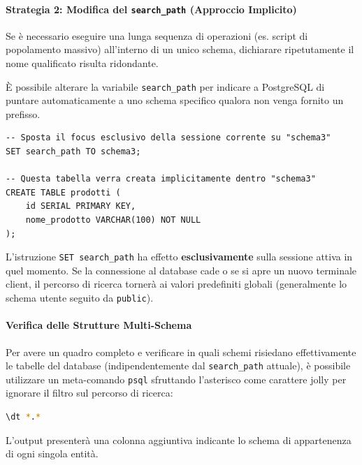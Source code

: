 \paragraph{Strategia 2: Modifica del \texttt{search\_path} (Approccio Implicito)}

Se è necessario eseguire una lunga sequenza di operazioni (es. script di popolamento massivo) all'interno di un unico schema, dichiarare ripetutamente il nome qualificato risulta ridondante. 

È possibile alterare la variabile \texttt{search\_path} per indicare a PostgreSQL di puntare automaticamente a uno schema specifico qualora non venga fornito un prefisso.

\begin{lstlisting}[language=PostgreSQL, title=Modifica del search\_path]
-- Sposta il focus esclusivo della sessione corrente su "schema3"
SET search_path TO schema3;

-- Questa tabella verra creata implicitamente dentro "schema3"
CREATE TABLE prodotti (
    id SERIAL PRIMARY KEY,
    nome_prodotto VARCHAR(100) NOT NULL
);
\end{lstlisting}

\begin{warningbox}
L'istruzione \texttt{SET search\_path} ha effetto \textbf{esclusivamente} sulla sessione attiva in quel momento. Se la connessione al database cade o se si apre un nuovo terminale client, il percorso di ricerca tornerà ai valori predefiniti globali (generalmente lo schema utente seguito da \texttt{public}).
\end{warningbox}

\paragraph{Verifica delle Strutture Multi-Schema}

Per avere un quadro completo e verificare in quali schemi risiedano effettivamente le tabelle del database (indipendentemente dal \texttt{search\_path} attuale), è possibile utilizzare un meta-comando \texttt{psql} sfruttando l'asterisco come carattere jolly per ignorare il filtro sul percorso di ricerca:

\begin{lstlisting}[language=bash, title=Ispezione globale delle tabelle]
\dt *.*
\end{lstlisting}
L'output presenterà una colonna aggiuntiva indicante lo schema di appartenenza di ogni singola entità.

